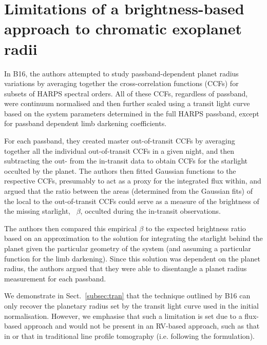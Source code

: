 \documentclass{aa}
\begin{document}
\vspace{-15pt}
\section{Limitations of a brightness-based approach to chromatic exoplanet radii}
\label{sec:calc}
In B16, the authors attempted to study passband-dependent planet radius variations by averaging together the cross-correlation functions (CCFs) for subsets of HARPS spectral orders. All of these CCFs, regardless of passband, were continuum normalised and then further scaled using a \cite{mandel02} transit light curve based on the system parameters determined in the full HARPS passband, except for passband dependent limb darkening coefficients.

For each passband, they created master out-of-transit CCFs by averaging together all the individual out-of-transit CCFs in a given night, and then subtracting the out- from the in-transit data to obtain CCFs for the starlight occulted by the planet. The authors then fitted Gaussian functions to the respective CCFs, presumably to act as a proxy for the integrated flux within, and argued that the ratio between the areas (determined from the Gaussian fits) of the local to the out-of-transit CCFs could serve as a measure of the brightness of the missing starlight, ~$\beta$, occulted during the in-transit observations.

The authors then compared this empirical $\beta$ to the expected brightness ratio based on an approximation to the solution for integrating the starlight behind the planet given the particular geometry of the system (and assuming a particular function for the limb darkening). Since this solution was dependent on the planet radius, the authors argued that they were able to disentangle a planet radius measurement for each passband. 

We demonstrate in Sect.~\ref{subsec:tran} that the technique outlined by B16 can only recover the planetary radius set by the transit light curve used in the initial normalisation. However, we emphasise that such a limitation is set due to a flux-based approach and would not be present in an RV-based approach, such as that in \cite{digloria15} or that in traditional line profile tomography (i.e. following the \citealt{cameron10} formulation). 

\vspace{-10pt}
\end{document}
